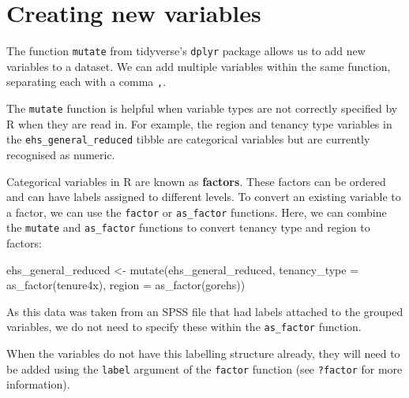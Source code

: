 \documentclass[
  letterpaper,
  DIV=11,
  numbers=noendperiod]{scrreprt}
\newenvironment{Shaded}{\begin{snugshade}}{\end{snugshade}}
\newcommand{\AttributeTok}[1]{\textcolor[rgb]{0.40,0.45,0.13}{#1}}
\newcommand{\FunctionTok}[1]{\textcolor[rgb]{0.28,0.35,0.67}{#1}}
\newcommand{\NormalTok}[1]{\textcolor[rgb]{0.00,0.23,0.31}{#1}}
\newcommand{\OtherTok}[1]{\textcolor[rgb]{0.00,0.23,0.31}{#1}}
\begin{document}
\section{Creating new variables}\label{creating-new-variables}

The function \texttt{mutate} from tidyverse's \texttt{dplyr} package
allows us to add new variables to a dataset. We can add multiple
variables within the same function, separating each with a comma
\texttt{,}.

The \texttt{mutate} function is helpful when variable types are not
correctly specified by R when they are read in. For example, the region
and tenancy type variables in the \texttt{ehs\_general\_reduced} tibble
are categorical variables but are currently recognised as numeric.

Categorical variables in R are known as \textbf{factors}. These factors
can be ordered and can have labels assigned to different levels. To
convert an existing variable to a factor, we can use the \texttt{factor}
or \texttt{as\_factor} functions. Here, we can combine the
\texttt{mutate} and \texttt{as\_factor} functions to convert tenancy
type and region to factors:

\begin{Shaded}
\begin{Highlighting}[]
\NormalTok{ehs\_general\_reduced }\OtherTok{\textless{}{-}} \FunctionTok{mutate}\NormalTok{(ehs\_general\_reduced,}
                              \AttributeTok{tenancy\_type =} \FunctionTok{as\_factor}\NormalTok{(tenure4x),}
                              \AttributeTok{region =} \FunctionTok{as\_factor}\NormalTok{(gorehs))}
\end{Highlighting}
\end{Shaded}

\begin{tcolorbox}[enhanced jigsaw, bottomrule=.15mm, left=2mm, leftrule=.75mm, bottomtitle=1mm, coltitle=black, colbacktitle=quarto-callout-note-color!10!white, toptitle=1mm, arc=.35mm, breakable, title=\textcolor{quarto-callout-note-color}{\faInfo}\hspace{0.5em}{Note}, rightrule=.15mm, toprule=.15mm, opacityback=0, opacitybacktitle=0.6, titlerule=0mm, colback=white, colframe=quarto-callout-note-color-frame]

As this data was taken from an SPSS file that had labels attached to the
grouped variables, we do not need to specify these within the
\texttt{as\_factor} function.

When the variables do not have this labelling structure already, they
will need to be added using the \texttt{label} argument of the
\texttt{factor} function (see \texttt{?factor} for more information).

\end{tcolorbox}
\end{document}
